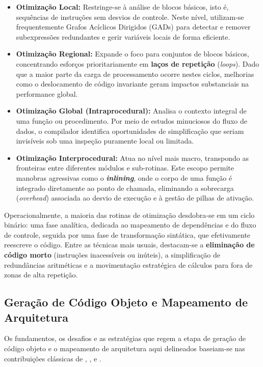 \begin{itemize}
    \item \textbf{Otimização Local:} Restringe-se à análise de blocos básicos, isto é, sequências de instruções sem desvios de controle. Neste nível, utilizam-se frequentemente Grafos Acíclicos Dirigidos (GADs) para detectar e remover subexpressões redundantes e gerir variáveis locais de forma eficiente.
    
    \item \textbf{Otimização Regional:} Expande o foco para conjuntos de blocos básicos, concentrando esforços prioritariamente em \textbf{laços de repetição} (\textit{loops}). Dado que a maior parte da carga de processamento ocorre nestes ciclos, melhorias como o deslocamento de código invariante geram impactos substanciais na performance global.
    
    \item \textbf{Otimização Global (Intraprocedural):} Analisa o contexto integral de uma função ou procedimento. Por meio de estudos minuciosos do fluxo de dados, o compilador identifica oportunidades de simplificação que seriam invisíveis sob uma inspeção puramente local ou limitada.
    
    \item \textbf{Otimização Interprocedural:} Atua no nível mais macro, transpondo as fronteiras entre diferentes módulos e sub-rotinas. Este escopo permite manobras agressivas como o \textbf{\textit{inlining}}, onde o corpo de uma função é integrado diretamente ao ponto de chamada, eliminando a sobrecarga (\textit{overhead}) associada ao desvio de execução e à gestão de pilhas de ativação.
\end{itemize}

Operacionalmente, a maioria das rotinas de otimização desdobra-se em um ciclo binário: uma fase analítica, dedicada ao mapeamento de dependências e do fluxo de controle, seguida por uma fase de transformação sintática, que efetivamente reescreve o código. Entre as técnicas mais usuais, destacam-se a \textbf{eliminação de código morto} (instruções inacessíveis ou inúteis), a simplificação de redundâncias aritméticas e a movimentação estratégica de cálculos para fora de zonas de alta repetição.

\subsection{Geração de Código Objeto e Mapeamento de Arquitetura}

Os fundamentos, os desafios e as estratégias que regem a etapa de geração de código objeto e o mapeamento de arquitetura aqui delineados baseiam-se nas contribuições clássicas de , ,  e .

